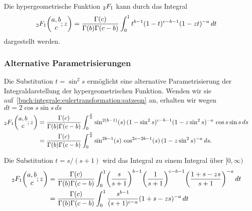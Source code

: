 \begin{satz}[Euler]
\label{buch:integrale:eulertransformation:satz}
Die hypergeometrische Funktion $\mathstrut_2F_1$ kann durch das 
Integral
\begin{equation}
\mathstrut_2F_1\biggl(\begin{matrix}a,b\\c\end{matrix};z\biggr)
=
\frac{\Gamma(c)}{\Gamma(b)\Gamma(c-b)}
\int_0^1
t^{b-1}(1-t)^{c-b-1}(1-zt)^{-a}
\,dt
\label{buch:integrale:eulertransformation:satzeqn}
\end{equation}
dargestellt werden.
\end{satz}

\subsubsection{Alternative Parametrisierungen}
Die Substitution $t=\sin^2 s$ ermöglicht eine alternative Parametrisierung
der Integraldarstellung der hypergeometrischen Funktion.
Wenden wir sie auf~\eqref{buch:integrale:eulertransformation:satzeqn}
an, erhalten wir wegen $dt = 2\cos s\sin s\,ds$
\begin{align*}
\mathstrut_2F_1\biggl(\begin{matrix}a,b\\c\end{matrix};z\biggr)
&=
\frac{\Gamma(c)}{\Gamma(b)\Gamma(c-b)}
\int_0^{\frac{\pi}2}
\sin^{2(b-1)}(s)\,
(1-\sin^2s)^{c-b-1} (1-z\sin^2 s)^{-a}
\,\cos s\sin s
\,ds
\\
&=
\frac{\Gamma(c)}{\Gamma(b)\Gamma(c-b)}
\int_0^{\frac{\pi}2}
\sin^{2b-1}(s)\,\cos^{2c-2b-1}(s)\, (1-z\sin^2 s)^{-a}
\,ds.
\end{align*}

Die Substitution $t=s/(s+1)$ wird das Integral zu einem Integral
über $[0,\infty)$
\begin{align*}
\mathstrut_2F_1\biggl(\begin{matrix}a,b\\c\end{matrix};z\biggr)
&=
\frac{\Gamma(c)}{\Gamma(b)\Gamma(c-b)}
\int_0^1
\biggl(\frac{s}{s+1}\biggr)^{b-1}
\biggl(\frac{1}{s+1}\biggr)^{c-b-1}
\biggl(\frac{1+s-zs}{s+1}\biggr)^{-a}
\,dt
\\
&=
\frac{\Gamma(c)}{\Gamma(b)\Gamma(c-b)}
\int_0^1
\frac{
s^{b-1}
}{
(s+1)^{c-a}
}
(1+s-zs)^{-a}
\,dt
\end{align*}

%
%
